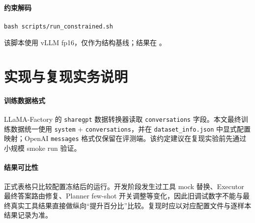 \documentclass[UTF8,a4paper,12pt]{ctexart}
\begin{document}
\paragraph{约束解码}
\begin{verbatim}
bash scripts/run_constrained.sh
\end{verbatim}
该脚本使用 vLLM fp16，仅作为结构基线；结果在
。

\section{实现与复现实务说明}
\paragraph{训练数据格式}
LLaMA-Factory 的 \texttt{sharegpt} 数据转换器读取 \texttt{conversations} 字段。本文最终训练数据统一使用 \texttt{system} + \texttt{conversations}，并在 \texttt{dataset\_info.json} 中显式配置映射；OpenAI \texttt{messages} 格式仅保留在评测端。该约定建议在复现实验前先通过小规模 smoke run 验证。

\paragraph{结果可比性}
正式表格只比较配置冻结后的运行。开发阶段发生过工具 mock 替换、Executor 最终答案路由修复、Planner few-shot 开关调整等变化，因此旧调试数字不能与最终真实工具结果直接做纵向“提升百分比”比较。复现时应以对应配置文件与逐样本结果记录为准。

\clearpage


\end{document}

